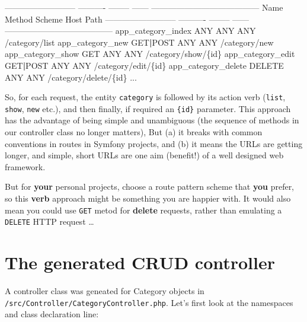 \documentclass[a4paperpaper,openright]{book}
\newenvironment{Shaded}{}{}
\newcommand{\DataTypeTok}[1]{\textcolor[rgb]{0.56,0.13,0.00}{#1}}
\newcommand{\ExtensionTok}[1]{#1}
\newcommand{\KeywordTok}[1]{\textcolor[rgb]{0.00,0.44,0.13}{\textbf{#1}}}
\newcommand{\NormalTok}[1]{#1}
\begin{document}
\begin{Shaded}
\begin{Highlighting}[]
     \ExtensionTok{--------------------------}\NormalTok{ ---------- -------- ------ ---------------------------------------}
      \ExtensionTok{Name}\NormalTok{                       Method     Scheme   Host   Path}
     \ExtensionTok{--------------------------}\NormalTok{ ---------- -------- ------ ---------------------------------------}
      \ExtensionTok{app_category_index}\NormalTok{             ANY        ANY      ANY    /category/list}
      \ExtensionTok{app_category_new}\NormalTok{               GET}\KeywordTok{|}\ExtensionTok{POST}\NormalTok{   ANY      ANY    /category/new}
      \ExtensionTok{app_category_show}\NormalTok{              GET        ANY      ANY    /category/show/}\DataTypeTok{\{id\}}
      \ExtensionTok{app_category_edit}\NormalTok{              GET}\KeywordTok{|}\ExtensionTok{POST}\NormalTok{   ANY      ANY    /category/edit/}\DataTypeTok{\{id\}}
      \ExtensionTok{app_category_delete}\NormalTok{            DELETE     ANY      ANY    /category/delete/}\DataTypeTok{\{id\}}
      \ExtensionTok{...}
\end{Highlighting}
\end{Shaded}

So, for each request, the entity \texttt{category} is followed by its
action verb (\texttt{list}, \texttt{show}, \texttt{new} etc.), and then
finally, if required an \texttt{\{id\}} parameter. This approach has the
advantage of being simple and unambiguous (the sequence of methods in
our controller class no longer matters), But (a) it breaks with common
conventions in routes in Symfony projects, and (b) it means the URLs are
getting longer, and simple, short URLs are one aim (benefit!) of a well
designed web framework.

But for \textbf{your} personal projects, choose a route pattern scheme
that \textbf{you} prefer, so this \textbf{verb} approach might be
something you are happier with. It would also mean you could use
\texttt{GET} metod for \textbf{delete} requests, rather than emulating a
\texttt{DELETE} HTTP request \ldots{}

\hypertarget{the-generated-crud-controller}{%
\section{The generated CRUD
controller}\label{the-generated-crud-controller}}

A controller class was geneated for Category objects in
\texttt{/src/Controller/CategoryController.php}. Let's first look at the
namespaces and class declaration line:
\end{document}
